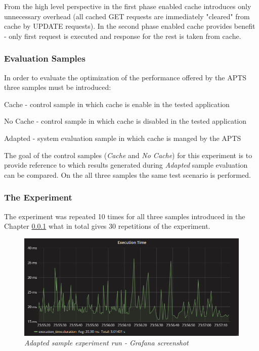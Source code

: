 \documentclass[12pt,a4paper]{article}
\let\tempone\itemize
\let\temptwo\enditemize
\renewenvironment{itemize}{\tempone\addtolength{\itemsep}{-0.4\baselineskip}}{\temptwo}
\begin{document}
From the high level perspective in the first phase enabled cache introduces only unnecessary overhead (all cached GET requests are immediately "cleared" from cache by UPDATE requests). In the second phase enabled cache provides benefit - only first request is executed and response for the rest is taken from cache.  

\subsubsection{Evaluation Samples} \label{evaluationsamplescache}

In order to evaluate the optimization of the performance offered by the APTS three  samples must be introduced: 
\begin{itemize}
\item Cache - control sample in which cache is enable in the tested application
\item No Cache - control sample in which cache is disabled in the tested application
\item Adapted - system evaluation sample in which cache is manged by the APTS
\end{itemize}

The goal of the control samples (\textit{Cache} and \textit{No Cache}) for this experiment is to provide reference to which results generated during \textit{Adapted} sample evaluation can be compared. On the all three samples the same test scenario is performed. 



\subsubsection{The Experiment} 

The experiment was repeated 10 times for all three samples introduced in the Chapter \ref{evaluationsamplescache} what in total gives 30 repetitions of the experiment.

\begin{figure}[!htb]
\centering
\includegraphics[width=1\textwidth]{cacheEval2}
\caption{\textit{Adapted sample experiment run - Grafana screenshot}} \label{figure:cachegraphanascreen}
\end{figure}
\end{document}
